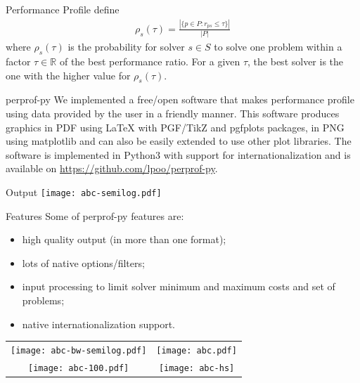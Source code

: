 \documentclass[a0paper,portrait]{baposter}
\begin{document}
\begin{poster}
\begin{posterbox}[column=0,below=auto]{Performance Profile}
    \textcite{Dolan2001} define
    \begin{align*}
      \rho_s(\tau) = \frac{| \{p \in P: r_{ps} \leq \tau\} |}{| P |}
    \end{align*}
    where $\rho_s(\tau)$ is the probability for solver $s \in S$ to solve one
    problem within a factor $\tau \in \mathbb{R}$ of the best performance
    ratio. For a given $\tau$, the best solver is the one with the higher
    value for $\rho_s(\tau)$.
  \end{posterbox}

  \begin{posterbox}[column=0,below=auto]{perprof-py}
    We implemented a free/open software that makes performance profile using data
    provided by the user in a friendly manner. This software produces graphics in PDF
    using LaTeX with PGF/TikZ and pgfplots packages,
    in PNG using matplotlib and can also be easily extended to
    use other plot libraries. The software is implemented in Python3 with
    support for internationalization and is available on
    \url{https://github.com/lpoo/perprof-py}.
  \end{posterbox}

  \begin{posterbox}[column=0,below=auto,name=output]{Output}
    \texttt{[image: abc-semilog.pdf]}
  \end{posterbox}

  \begin{posterbox}[column=1]{Features}
    Some of perprof-py features are:
    \begin{itemize}
      \item high quality output (in more than one format);
      \item lots of native options/filters;
      \item input processing to limit solver minimum and maximum costs and set
        of problems;
      \item native internationalization support.
    \end{itemize}

    \begin{center}
      \begin{tabular}{cc}
        \texttt{[image: abc-bw-semilog.pdf]} &
        \texttt{[image: abc.pdf]} \\
        \texttt{[image: abc-100.pdf]} &
        \texttt{[image: abc-hs]}
      \end{tabular}
    \end{center}


\end{posterbox}
\end{poster}
\end{document}
